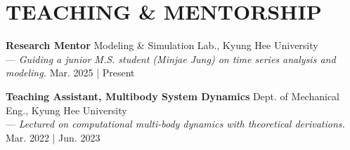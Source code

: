\documentclass[a4paper,10pt]{extarticle}
\begin{document}
\section*{TEACHING \& MENTORSHIP}
\textbf{Research Mentor} \hfill Modeling \& Simulation Lab., Kyung Hee University\\
--- {\small\textsl{Guiding a junior M.S. student (Minjae Jung) on time series analysis and modeling.}} \hfill Mar. 2025 | Present\\ %
\vspace*{-0.2cm}

\noindent
\textbf{Teaching Assistant, Multibody System Dynamics} \hfill Dept. of Mechanical Eng., Kyung Hee University\\
--- {\small\textsl{Lectured on computational multi-body dynamics with  theoretical derivations.}} \hfill Mar. 2022 | Jun. 2023 %


\end{document}
